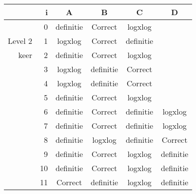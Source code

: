 \begin{tabular}{ rr| c|c|c|c}\hline\hline
     & i & \textbf{A} & \textbf{B} & \textbf{C} & \textbf{D}\\\hline

&0&definitie&Correct\cellcolor[gray]{0.6}&logxlog\\
Level 2 & 1&logxlog&Correct\cellcolor[gray]{0.6}&definitie\\
keer &2&definitie&Correct\cellcolor[gray]{0.6}&logxlog\\
&3&logxlog&definitie&Correct\cellcolor[gray]{0.6}\\
&4&logxlog&definitie&Correct\cellcolor[gray]{0.6}\\
&5&definitie&Correct\cellcolor[gray]{0.6}&logxlog\\
&6&definitie&Correct\cellcolor[gray]{0.6}&definitie&logxlog\\
&7&definitie&Correct\cellcolor[gray]{0.6}&definitie&logxlog\\
&8&definitie&logxlog&definitie&Correct\cellcolor[gray]{0.6}\\
&9&definitie&Correct\cellcolor[gray]{0.6}&logxlog&definitie\\
&10&definitie&Correct\cellcolor[gray]{0.6}&logxlog&definitie\\
&11&Correct\cellcolor[gray]{0.6}&definitie&logxlog&definitie\\
\hline\end{tabular}\par\ \newline

